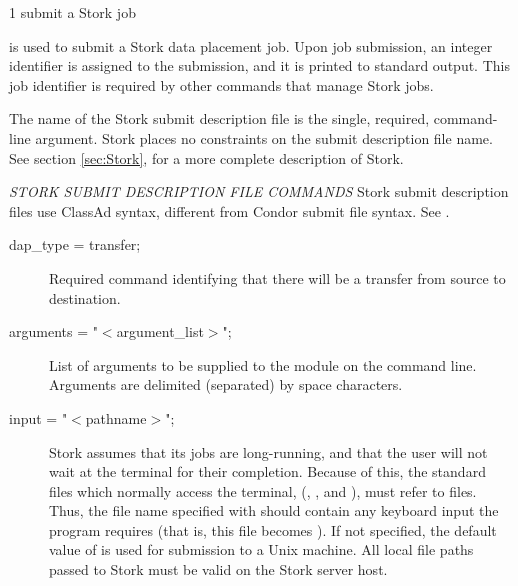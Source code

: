 \begin{ManPage}{\label{man-stork-submit}}{1}
{submit a Stork job}
\Synopsis {}
\ToolArgsBase

\Storkname
{}



\Description 

 is used to submit a Stork data placement job.
Upon job submission, an integer identifier is assigned to the
submission,
	and it is printed to standard output.
This job identifier is required by other commands
that manage Stork jobs.

The name of the Stork submit description file is the single,
required, command-line argument.
Stork places no constraints on the submit
description file name.
See section \ref{sec:Stork}, for a more 
complete description of Stork.

\emph{STORK SUBMIT DESCRIPTION FILE COMMANDS}
Stork submit description files use ClassAd syntax, different from Condor submit
file syntax.  See .

\begin{description}

\item[dap\_type = transfer;]
Required command identifying that there will be
a transfer from source to destination.


\item[arguments = "$<$argument\_list$>$";]
List of arguments to be supplied
to the module on the command line.
Arguments are delimited (separated) by space characters.


\item[input = "$<$pathname$>$";]
Stork assumes that its jobs are
long-running, and that the user will not wait at the terminal for their
completion. Because of this, the standard files which normally access
the terminal, (, , and ),
must refer to files. Thus,
the file name specified with  should contain any keyboard
input the program requires (that is, this file becomes ).
If not specified, the default value
of  is used for submission to a Unix machine.
All local file paths passed to Stork must be valid on the Stork server host.


\end{description}
\end{ManPage}
